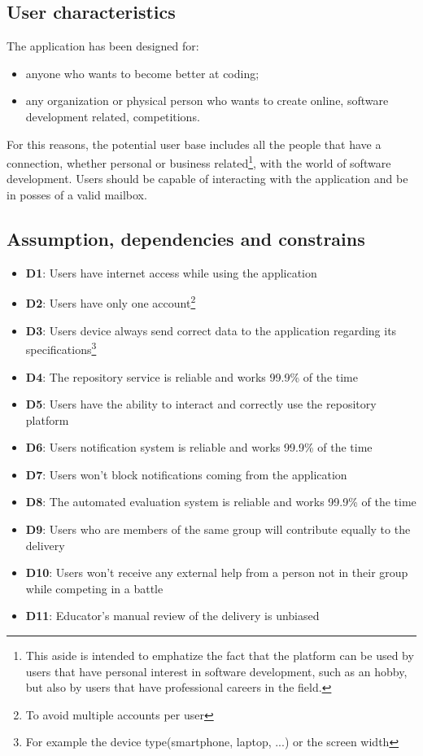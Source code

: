 \documentclass[../RASD.tex]{subfiles}
\begin{document}
    \subsection{User characteristics}\label{subsec:user_characteristics}
    The application has been designed for:
    \begin{itemize}
        \item anyone who wants to become better at coding;
        \item any organization or physical person who wants to create online, software development related, competitions.
    \end{itemize}
    For this reasons, the potential user base includes all the people that have a connection, whether personal or business related\footnote{This aside is intended to emphatize the fact that the platform can be used by users that have personal interest in software development, such as an hobby, but also by users that have professional careers in the field.}, with the world of software development.
    Users should be capable of interacting with the application and be in posses of a valid mailbox.
    \newpage
    \subsection{Assumption, dependencies and constrains}\label{subsec:assumption_dependencies_and_constrain}
    \begin{itemize}
        \item {\textbf{D1}: Users have internet access while using the application}
        \item {\textbf{D2}: Users have only one account\footnote{To avoid multiple accounts per user}}
        \item {\textbf{D3}: Users device always send correct data to the application regarding its specifications\footnote{For example the device type(smartphone, laptop, ...) or the screen width}}
        \item {\textbf{D4}: The repository service is reliable and works 99.9\% of the time}
        \item {\textbf{D5}: Users have the ability to interact and correctly use the repository platform}
        \item {\textbf{D6}: Users notification system is reliable and works 99.9\% of the time}
        \item {\textbf{D7}: Users won't block notifications coming from the application}
        \item {\textbf{D8}: The automated evaluation system is reliable and works 99.9\% of the time}
        \item {\textbf{D9}: Users who are members of the same group will contribute equally to the delivery}
        \item {\textbf{D10}: Users won't receive any external help from a person not in their group while competing in a battle}
        \item {\textbf{D11}: Educator's manual review of the delivery is unbiased}
    \end{itemize}\newpage
    
\end{document}
